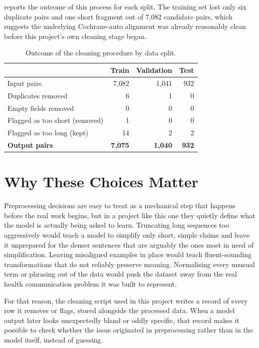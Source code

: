  reports the outcome of this process for each split. The training set lost only six duplicate pairs and one short fragment out of 7{,}082 candidate pairs, which suggests the underlying Cochrane-auto alignment was already reasonably clean before this project's own cleaning stage began.

\begin{table}[htbp]
    \centering
    \caption{Outcome of the cleaning procedure by data split.}
    \label{tab:preprocessing-log}
    \begin{tabular}{@{}lrrr@{}}
        \toprule
         & \textbf{Train} & \textbf{Validation} & \textbf{Test} \\
        \midrule
        Input pairs & 7{,}082 & 1{,}041 & 932 \\
        Duplicates removed & 6 & 1 & 0 \\
        Empty fields removed & 0 & 0 & 0 \\
        Flagged as too short (removed) & 1 & 0 & 0 \\
        Flagged as too long (kept) & 14 & 2 & 2 \\
        \textbf{Output pairs} & \textbf{7{,}075} & \textbf{1{,}040} & \textbf{932} \\
        \bottomrule
    \end{tabular}
\end{table}

\section{Why These Choices Matter}
\label{sec:cleaning-rationale}

Preprocessing decisions are easy to treat as a mechanical step that happens before the real work begins, but in a project like this one they quietly define what the model is actually being asked to learn. Truncating long sequences too aggressively would teach a model to simplify only short, simple claims and leave it unprepared for the denser sentences that are arguably the ones most in need of simplification. Leaving misaligned examples in place would teach fluent-sounding transformations that do not reliably preserve meaning. Normalising every unusual term or phrasing out of the data would push the dataset away from the real health communication problem it was built to represent.

For that reason, the cleaning script used in this project writes a record of every row it removes or flags, stored alongside the processed data. When a model output later looks unexpectedly bland or oddly specific, that record makes it possible to check whether the issue originated in preprocessing rather than in the model itself, instead of guessing.
